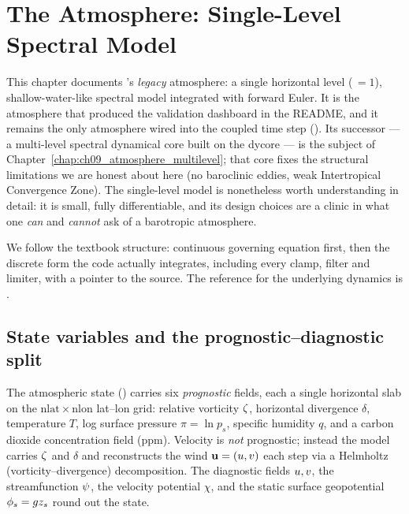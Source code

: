 \chapter{The Atmosphere: Single-Level Spectral Model}\label{chap:ch10_atmosphere_singlelevel}

\providecommand{\lnps}{\ensuremath{\pi}}   %
\providecommand{\spechum}{q}               %
\providecommand{\divg}{\delta}             %

This chapter documents \model's \emph{legacy} atmosphere: a single horizontal
level (\,$=1$), shallow-water-like spectral model integrated
with forward Euler. It is the atmosphere that produced the validation dashboard in
the README, and it remains the only atmosphere wired into the coupled time step
(). Its successor --- a multi-level spectral dynamical
core built on the \dino{} dycore --- is the subject of
Chapter~\ref{chap:ch09_atmosphere_multilevel}; that core fixes the structural
limitations we are honest about here (no baroclinic eddies, weak Intertropical
Convergence Zone). The single-level model is nonetheless worth understanding in
detail: it is small, fully differentiable, and its design choices are a clinic in
what one \emph{can} and \emph{cannot} ask of a barotropic atmosphere.

We follow the textbook structure: continuous governing equation first, then the
discrete form the code actually integrates, including every clamp, filter and
limiter, with a pointer to the source. The reference for the underlying dynamics
is \citet{vallis2017}.

\section{State variables and the prognostic--diagnostic split}

The atmospheric state () carries six \emph{prognostic} fields, each a single
horizontal slab on the $\mathrm{nlat}\times\mathrm{nlon}$ lat--lon grid:
relative vorticity $\zeta$, horizontal divergence $\divg$, temperature $T$,
log surface pressure $\lnps=\ln p_s$, specific humidity $\spechum$, and a carbon
dioxide concentration field (ppm). Velocity is \emph{not} prognostic; instead the
model carries $\zeta$ and $\divg$ and reconstructs the wind $\mathbf{u}=(u,v)$ each
step via a Helmholtz (vorticity--divergence) decomposition. The diagnostic fields
$u,v$, the streamfunction $\psi$, the velocity potential $\chi$, and the
static surface geopotential $\phi_s=g z_s$ round out the state.

